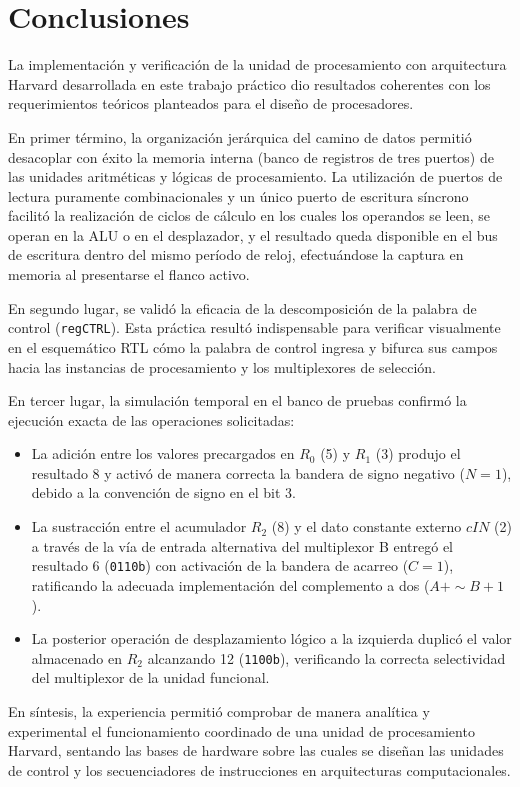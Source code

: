 \chapter{Conclusiones}\label{sec.ej1:conclusiones}

La implementación y verificación de la unidad de procesamiento con arquitectura Harvard desarrollada en este trabajo
práctico dio resultados coherentes con los requerimientos teóricos planteados para el diseño de procesadores.

En primer término, la organización jerárquica del camino de datos permitió desacoplar con éxito la memoria interna
(banco de registros de tres puertos) de las unidades aritméticas y lógicas de procesamiento. La utilización de puertos
de lectura puramente combinacionales y un único puerto de escritura síncrono facilitó la realización de ciclos de
cálculo en los cuales los operandos se leen, se operan en la ALU o en el desplazador, y el resultado queda disponible
en el bus de escritura dentro del mismo período de reloj, efectuándose la captura en memoria al presentarse el flanco
activo.

En segundo lugar, se validó la eficacia de la descomposición de la palabra de control (\texttt{regCTRL}). Esta práctica
resultó indispensable para verificar visualmente en el esquemático RTL cómo la palabra de control ingresa y bifurca sus
campos hacia las instancias de procesamiento y los multiplexores de selección.

En tercer lugar, la simulación temporal en el banco de pruebas confirmó la ejecución exacta de las operaciones
solicitadas:
\begin{itemize}
  \item La adición entre los valores precargados en $R_0$ (5) y $R_1$ (3) produjo el resultado 8 y
        activó de manera correcta la bandera de signo negativo ($N = 1$), debido a la convención de signo en el bit 3.
  \item La sustracción entre el acumulador $R_2$ (8) y el dato constante externo $cIN$ (2) a través de la vía de
        entrada alternativa del multiplexor B entregó el resultado 6 (\texttt{0110b}) con activación de la bandera de
        acarreo ($C = 1$), ratificando la adecuada implementación del complemento a dos ($A + \sim B + 1$).
  \item La posterior operación de desplazamiento lógico a la izquierda duplicó el valor almacenado en $R_2$ alcanzando
        12 (\texttt{1100b}), verificando la correcta selectividad del multiplexor de la unidad funcional.
\end{itemize}

En síntesis, la experiencia permitió comprobar de manera analítica y experimental el funcionamiento coordinado de una
unidad de procesamiento Harvard, sentando las bases de hardware sobre las cuales se diseñan las unidades de control y
los secuenciadores de instrucciones en arquitecturas computacionales.
